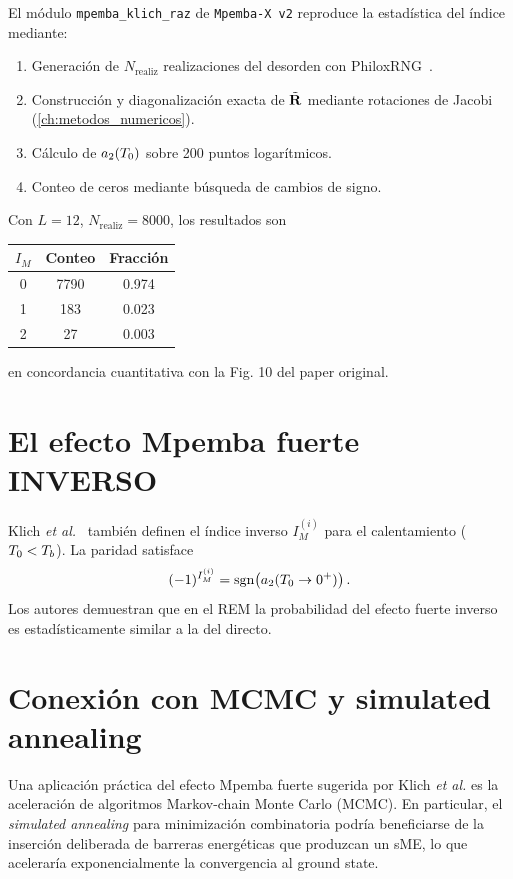 El módulo \texttt{mpemba\_klich\_raz} de \texttt{Mpemba-X v2} reproduce la 
estadística del índice mediante:

\begin{enumerate}
\item Generación de $N_{\mathrm{realiz}}$ realizaciones del desorden con 
PhiloxRNG~\cite{salmon2011}.
\item Construcción y diagonalización exacta de $\tilde{\vb{R}}$ mediante 
rotaciones de Jacobi (\cref{ch:metodos_numericos}).
\item Cálculo de $a_{2}(T_{0})$ sobre 200 puntos logarítmicos.
\item Conteo de ceros mediante búsqueda de cambios de signo.
\end{enumerate}

\noindent Con $L = 12$, $N_{\mathrm{realiz}} = 8000$, los resultados son
%
\begin{center}
\begin{tabular}{ccc}
\toprule
$I_M$ & Conteo & Fracción \\
\midrule
0 & 7790 & 0.974 \\
1 & 183 & 0.023 \\
2 & 27 & 0.003 \\
\bottomrule
\end{tabular}
\end{center}
%
en concordancia cuantitativa con la Fig. 10 del paper original.

\section{El efecto Mpemba fuerte INVERSO}

Klich \emph{et al.}~\cite{klichraz2019} también definen el índice inverso 
$I_M^{(i)}$ para el calentamiento ($T_{0} < T_{b}$). La paridad satisface
\begin{equation}
    (-1)^{I_{M}^{(i)}} = \operatorname{sgn}\!\left(a_{2}(T_{0} \to 0^+)\right).
\end{equation}
%
Los autores demuestran que en el REM la probabilidad del efecto fuerte 
inverso es estadísticamente similar a la del directo.

\section{Conexión con MCMC y simulated annealing}

Una aplicación práctica del efecto Mpemba fuerte sugerida por Klich \emph{et al.} 
es la aceleración de algoritmos Markov-chain Monte Carlo (MCMC). En particular, 
el \emph{simulated annealing} para minimización combinatoria podría beneficiarse 
de la inserción deliberada de barreras energéticas que produzcan un sME, lo que 
aceleraría exponencialmente la convergencia al ground state.

